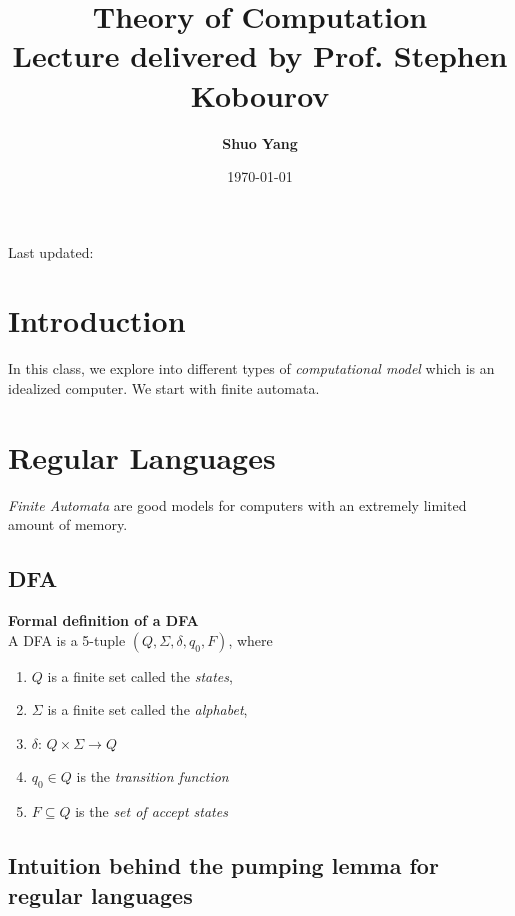 \documentclass[11pt]{article}
\title{\bf Theory of Computation\\[2ex]
  \rm\normalsize Lecture delivered by Prof. Stephen Kobourov}
\author{\bf Shuo Yang}
\begin{document}
\maketitle

\begin{center}
Last updated: \date{\today}
\end{center}

\section{Introduction}

In this class, we explore into different types of \emph{computational
  model} which is an idealized computer. We start with finite automata.

\section{Regular Languages}

\emph{Finite Automata} are good models for computers with an extremely
limited amount of memory.

\subsection{DFA}

\begin{mdframed}[backgroundcolor=yellow2] %
\textbf{Formal definition of a DFA}\\

A DFA is a 5-tuple $(Q, \Sigma, \delta, q_0, F)$, where
\begin{enumerate}
\item $Q$ is a finite set called the \emph{states},
\item $\Sigma$ is a finite set called the \emph{alphabet},
\item $\delta$: $Q \times \Sigma \rightarrow Q$
\item $q_0 \in Q$ is the \emph{transition function}
\item $F \subseteq Q$ is the \emph{set of accept states}
\end{enumerate}
\end{mdframed}

\subsection{Intuition behind the pumping lemma for regular languages}
\end{document}
